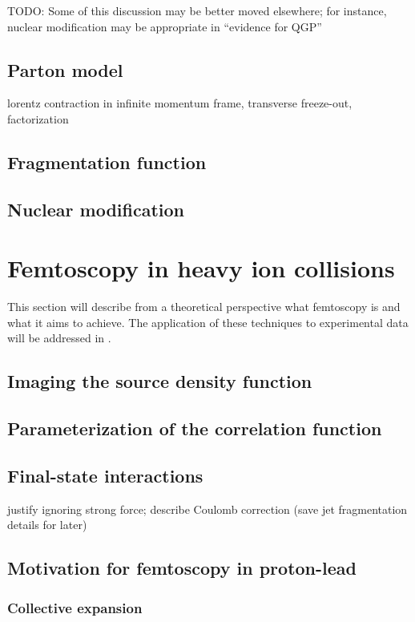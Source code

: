 TODO: Some of this discussion may be better moved elsewhere; for instance, nuclear modification may be appropriate in ``evidence for QGP''
\subsection{Parton model}
lorentz contraction in infinite momentum frame, transverse freeze-out, factorization
\subsection{Fragmentation function}
\subsection{Nuclear modification}


\section{Femtoscopy in heavy ion collisions}
This section will describe from a theoretical perspective what femtoscopy is and what it aims to achieve. The application of these techniques to experimental data will be addressed in .
\subsection{Imaging the source density function}
\subsection{Parameterization of the correlation function}
\subsection{Final-state interactions}
justify ignoring strong force; describe Coulomb correction (save jet fragmentation details for later)
\subsection{Motivation for femtoscopy in proton-lead}
\subsubsection{Collective expansion}

